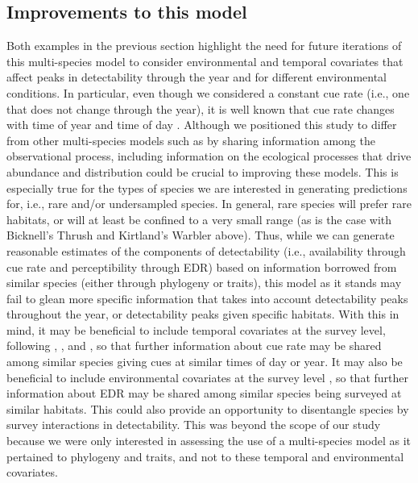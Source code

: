 \documentclass[12pt]{article}
\begin{document}
\subsection{Improvements to this model}

Both examples in the previous section highlight the need for future iterations of this multi-species model to consider environmental and temporal covariates that affect peaks in detectability through the year and for different environmental conditions. 
In particular, even though we considered a constant cue rate (i.e., one that does not change through the year), it is well known that cue rate changes with time of year and time of day \citep{solymos_evaluating_2018, edwards_point_2023}.
Although we positioned this study to differ from other multi-species models such as \citet{gilbert_multispecies_2024} by sharing information among the observational process, including information on the ecological processes that drive abundance and distribution could be crucial to improving these models. 
This is especially true for the types of species we are interested in generating predictions for, i.e., rare and/or undersampled species.
In general, rare species will prefer rare habitats, or will at least be confined to a very small range (as is the case with Bicknell’s Thrush and Kirtland’s Warbler above). 
Thus, while we can generate reasonable estimates of the components of detectability (i.e., availability through cue rate and perceptibility through EDR) based on information borrowed from similar species (either through phylogeny or traits), this model as it stands may fail to glean more specific information that takes into account detectability peaks throughout the year, or detectability peaks given specific habitats. 
With this in mind, it may be beneficial to include temporal covariates at the survey level, following \citet{solymos_calibrating_2013}, \citet{solymos_evaluating_2018}, and \citet{edwards_point_2023}, so that further information about cue rate may be shared among similar species giving cues at similar times of day or year.
It may also be beneficial to include environmental covariates at the survey level \citep{solymos_calibrating_2013, edwards_point_2023}, so that further information about EDR may be shared among similar species being surveyed at similar habitats.
This could also provide an opportunity to disentangle species by survey interactions in detectability.
This was beyond the scope of our study because we were only interested in assessing the use of a multi-species model as it pertained to phylogeny and traits, and not to these temporal and environmental covariates.
\end{document}
